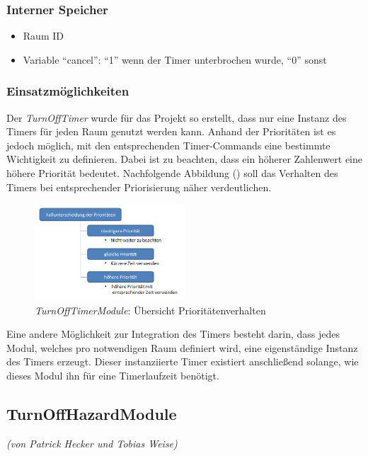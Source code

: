 \subsubsection{Interner Speicher}
\begin{itemize}
	\item Raum ID
	\item Variable "`cancel"': "`1"' wenn der Timer unterbrochen wurde, "`0"' sonst
\end{itemize}

\subsubsection{Einsatzmöglichkeiten}
Der \emph{TurnOffTimer} wurde für das Projekt so erstellt, dass nur eine Instanz des Timers für jeden Raum genutzt werden kann. Anhand der Prioritäten ist es jedoch möglich, mit den entsprechenden Timer-Commands eine bestimmte Wichtigkeit zu definieren. Dabei ist zu beachten, dass ein höherer Zahlenwert eine höhere Priorität bedeutet. Nachfolgende Abbildung () soll das Verhalten des Timers bei entsprechender Priorisierung näher verdeutlichen.

\begin{figure}[h!]
	\centering
	\includegraphics[width=0.5\textwidth]{img/Modulkonzeption/TurnOffTimer.png}
	\caption{\emph{TurnOffTimerModule}: Übersicht Prioritätenverhalten}
	\label{fig:turnOffTimer}
\end{figure}

Eine andere Möglichkeit zur Integration des Timers besteht darin, dass jedes Modul, welches pro notwendigen Raum definiert wird, eine eigenständige Instanz des Timers erzeugt. Dieser instanziierte Timer existiert anschließend solange, wie dieses Modul ihn für eine Timerlaufzeit benötigt.


\newpage
\subsection{TurnOffHazardModule}
\emph{(von Patrick Hecker und Tobias Weise)}

